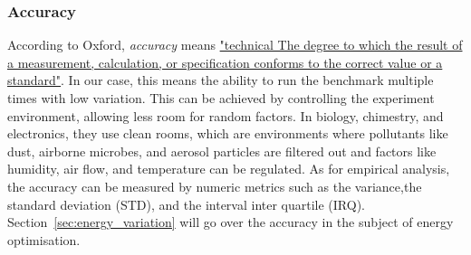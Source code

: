 \subsubsection{Accuracy}
According to Oxford, \emph{accuracy} means \href{https://www.lexico.com/definition/accuracy}{"technical The degree to which the result of a measurement, calculation, or specification conforms to the correct value or a standard"}.
In our case, this means the ability to run the benchmark multiple times with low variation. This can be achieved by controlling the experiment environment, allowing less room for random factors.
In biology, chimestry, and electronics, they use clean rooms, which are environments where pollutants like dust, airborne microbes, and aerosol particles are filtered out and factors like humidity, air flow, and temperature can be regulated. As for empirical analysis, the accuracy can be measured by numeric metrics such as the variance,the standard deviation (STD), and the interval inter quartile (IRQ).
Section~\ref{sec:energy_variation} will go over the accuracy in the subject of energy optimisation.

